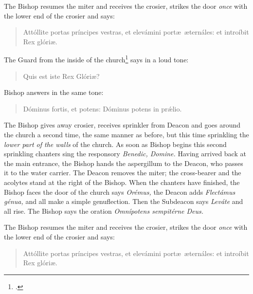 \documentclass[letterpaper]{report}
\begin{document}
{    \rubric The Bishop resumes the miter and receives the crosier, strikes the
    door \textit{once} with the lower end of the crosier and says:

    \begin{quote}
        Attóllite portas príncipes vestras, et elevámini port\ae\ \ae ternáles: et
        introíbit Rex glóri\ae.
    \end{quote}

    The Guard from the inside of the church\footcite[The door may be slightly
    open, so that the bishop and the deacon of the church can hear each
    other.][note 1, p. 46.]{consecranda} says in a loud tone:

    \begin{quote}
       Quis est iste Rex Glóri\ae? 
    \end{quote}

    Bishop answers in the same tone:

    \begin{quote}
        Dóminus fortis, et potens: Dóminus potens in pr\'\ae lio.
    \end{quote}

    \rubric The Bishop gives away crosier, receives sprinkler from Deacon and
    goes around the church a second time, the same manner as before, but this
    time sprinkling the \textit{lower part of the walls} of the church. As soon
    as Bishop begins this second sprinkling chanters sing the responsory
    \textit{Benedic, Domine.} Having arrived back at the main entrance, the
    Bishop hands the aspergillum to the Deacon, who passes it to the water
    carrier. The Deacon removes the miter; the cross-bearer and the acolytes
    stand at the right of the Bishop. When the chanters have finished, the
    Bishop faces the door of the church says \textit{Orémus,} the Deacon adds
    \textit{Flectámus génua,} and all make a simple genuflection. Then the
    Subdeacon says \textit{Leváte} and all rise. The Bishop says the oration
    \textit{Omnípotens sempitérne Deus.}


    \rubric The Bishop resumes the miter and receives the crosier, strikes the
    door \textit{once} with the lower end of the crosier and says:

    \begin{quote}
        Attóllite portas príncipes vestras, et elevámini port\ae\ \ae ternáles:
        et introíbit Rex glóri\ae.
    \end{quote}

}
\end{document}
